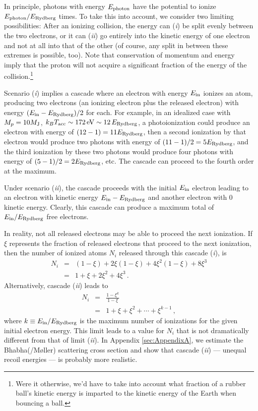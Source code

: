 \documentclass[iop,numberedappendix,apj]{emulateapj}
\begin{document}
In principle, photons with energy $E_{\rm photon}$ have the potential to ionize $E_{\rm photon}/E_{\rm Rydberg}$ times.
To take this into account, we consider two limiting possibilities:
After an ionizing collision, the energy can (\emph{i}) be split evenly between the two electrons, or it can (\emph{ii}) go entirely into the kinetic energy of one electron and not at all into that of the other (of course, any split in between these extremes is possible, too).
Note that conservation of momentum and energy imply that the proton will not acquire a significant fraction of the energy of the collision.\footnote{Were it otherwise, we'd have to take into account what fraction of a rubber ball's kinetic energy is imparted to the kinetic energy of the Earth when bouncing a ball.}  

Scenario (\emph{i}) implies a cascade where an electron with energy $E_{\rm in}$ ionizes an atom, producing two electrons (an ionizing electron plus the released electron) with energy $ ( E_{\rm in} - E_{\rm Rydberg} ) /2 $ for each.
For example, in an idealized case with $M_p = 10 M_{\rm J}$, $k_B T_{\rm acc} \sim 172\,{\rm eV} \sim 12 \, E_{\rm Rydberg}$, a photoionization could produce an electron with energy of $(12-1) = 11 E_{\rm Rydberg} $, then a second ionization by that electron would produce two photons with energy of $(11-1)/2 = 5 E_{\rm Rydberg}$, and the third ionization by these two photons would produce four photons with energy of $(5-1)/2 = 2 E_{\rm Rydberg}$, etc.
The cascade can proceed to the fourth order at the maximum.

Under scenario (\emph{ii}), the cascade proceeds with the initial $E_{\rm in}$ electron leading to an electron with kinetic energy $E_{\rm in} - E_{\rm Rydberg}$ and another electron with 0 kinetic energy.
Clearly, this cascade can produce a maximum total of $E_{\rm in} / E_{\rm Rydberg}$ free electrons.

In reality, not all released electrons may be able to proceed the next ionization.
If $\xi$ represents the fraction of released electrons that proceed to the next ionization, then the number of ionized atoms $N_i$ released through this cascade (\emph{i}), is
\begin{eqnarray}
  \nonumber N_i & = & (1-\xi) + 2\xi (1-\xi) + 4 \xi^2 (1-\xi) + 8 \xi^3 \\
  \label{eq:N_i1} & = & 1 + \xi + 2 \xi^2 + 4 \xi ^3 \, .
\end{eqnarray}
Alternatively, cascade (\emph{ii}) leads to
\begin{eqnarray}
  \nonumber N_i & = & \frac{1 - \xi^k}{1 - \xi} \\
  \label{eq:N_i2}  & = & 1 + \xi + \xi^2 + \cdots + \xi^{k - 1} \, ,
\end{eqnarray}
where $k \equiv E_{\rm in} / E_{\rm Rydberg}$ is the maximum number of ionizations for the given initial electron energy.
This limit leads to a value for $N_i$ that is not dramatically different from that of limit (\emph{ii}).
In Appendix \ref{sec:AppendixA}, we estimate the Bhabha(/M{\o}ller) scattering cross section and show that cascade (\emph{ii}) --- unequal recoil energies --- is probably more realistic.
\end{document}
